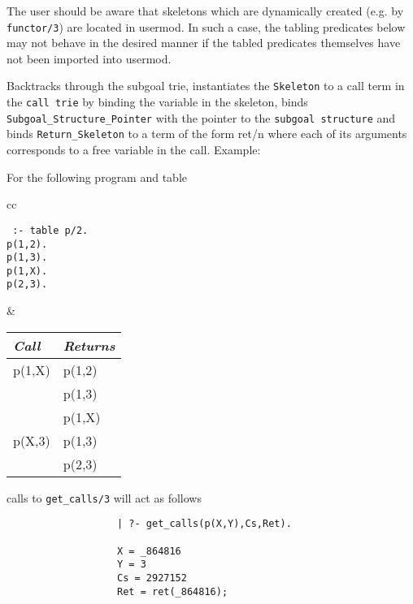 The user should be aware that skeletons which are dynamically created
(e.g. by {\tt functor/3}) are located in usermod.  In such a case, the
tabling predicates below may not behave in the desired manner if the
tabled predicates themselves have not been imported into usermod.

\begin{description}

Backtracks through the subgoal trie, instantiates the {\tt Skeleton}
to a call term in the {\tt call trie} by binding the variable in the skeleton,
binds {\tt Subgoal\_Structure\_Pointer} with the pointer to the 
{\tt subgoal structure} and binds {\tt Return\_Skeleton} to 
a term of the form ret/n where each of its arguments corresponds to
a free variable in the call.
Example:

For the following program and table
     \begin{center}
     \begin{tabular}{cc}
     \begin{minipage}{1.1in}
     {\tt
          :- table p/2.	\\
          p(1,2).       \\
          p(1,3).       \\
          p(1,X).       \\
          p(2,3). 
     }
     \end{minipage}
     &
     \begin{tabular}{||l|l||}   \hline
     {\em Call}			& {\em Returns} \\ \hline \hline
     p(1,X)			& p(1,2) \\ 
 	       			& p(1,3) \\
                                & p(1,X) \\ \hline
     p(X,3)			& p(1,3) \\ 
 	       			& p(2,3) \\ \hline
     \end{tabular}
     \end{tabular}
     \end{center}
calls to {\tt get\_calls/3} will act as follows
	{\footnotesize
	\begin{verbatim}
                   | ?- get_calls(p(X,Y),Cs,Ret).

                   X = _864816
                   Y = 3
                   Cs = 2927152
                   Ret = ret(_864816);


\end{verbatim}}
\end{description}
